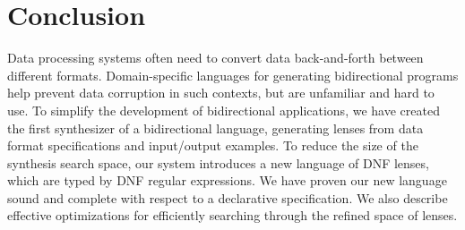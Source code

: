 \documentclass[acmsmall,screen]{acmart}
\begin{document}





\section{Conclusion}
\label{sec:conc}

Data processing systems often need to convert data back-and-forth
between different formats.  Domain-specific languages for generating
bidirectional programs help prevent data corruption in such contexts,
but are unfamiliar and hard to use.  To simplify the development of
bidirectional applications, we have created the first synthesizer of a
bidirectional language, generating
lenses from data format specifications and input/output examples.
To reduce the size of the synthesis search space, our system introduces
a new language of DNF lenses, which are typed by DNF regular expressions.
We have proven our new language sound and complete with respect to
a declarative specification.  We also describe effective optimizations
for efficiently searching through the refined space of lenses.
\end{document}
